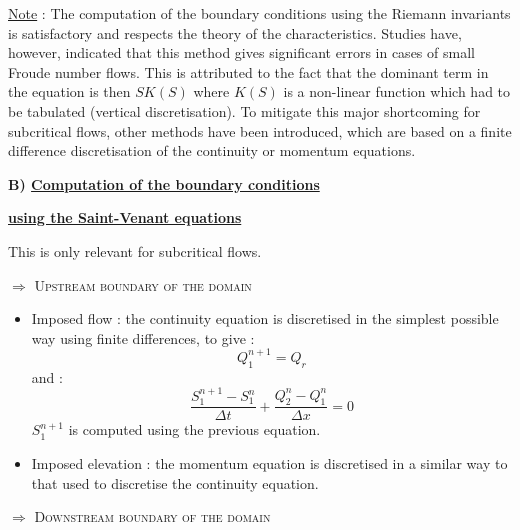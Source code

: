 \underline{Note} : The computation of the boundary conditions using the Riemann invariants is satisfactory and respects the theory of the characteristics. Studies have, however, indicated that this method gives significant errors in cases of small Froude number flows. This is attributed to the fact that the dominant term in the equation is then $SK(S)$ where $K(S)$ is a non-linear function which had to be tabulated (vertical discretisation). To mitigate this major shortcoming for subcritical flows, other methods have been introduced, which are based on a finite difference discretisation of the continuity or momentum equations.

\vspace{0.5cm}

\textbf{B) \underline{Computation of the boundary conditions}}

\hspace{0.6cm}\textbf{\underline{ using the Saint-Venant equations}}

\vspace{0.5cm}

This is only relevant for subcritical flows.

\vspace{0.5cm}

$\Longrightarrow$ \textsc{Upstream boundary of the domain}

\vspace{0.5cm}

\begin{itemize}
 \item Imposed flow : the continuity equation is discretised in the simplest possible way using finite differences, to give :
   \begin{equation}
     Q_{1}^{n+1} = Q_r
   \end{equation}
   and :
   \begin{equation}
     \frac{S_{1}^{n+1}-S_{1}^{n}}{\Delta t} + \frac{Q_{2}^n - Q_{1}^n}{\Delta x} = 0
   \end{equation}
   $S_{1}^{n+1}$ is computed using the previous equation.
 \item Imposed elevation : the momentum equation is discretised in a similar way to that used to discretise the continuity equation.
\end{itemize}

\vspace{0.5cm}

$\Longrightarrow$ \textsc{Downstream boundary of the domain}

\vspace{0.5cm}

